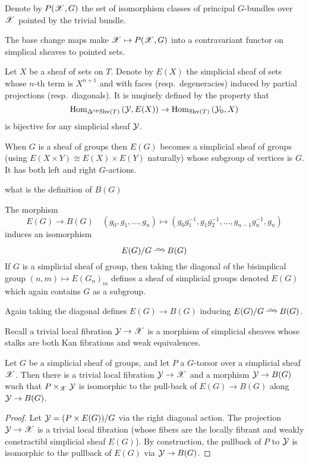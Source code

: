 \documentclass[12pt]{article}
\begin{document}
Denote by $P(\mathscr{X}, G)$ the set of isomorphism classes of principal $G$-bundles over $\mathscr{X}$ pointed by the trivial bundle.

\begin{rmk}
The base change maps make $\mathscr{X} \mapsto P(\mathscr{X}, G)$ into a contravariant functor on simplical sheaves to pointed sets. 
\end{rmk}

\begin{defn}
Let $X$ be a sheaf of sets on $T$. Denote by $E(X)$ the simplicial sheaf of sets whose $n$-th term is $X^{n+1}$ and with faces (resp.\ degeneracies) induced by partial projections (resp.\ diagonals). It is unqiuely defined by the property that
\[ \mathrm{Hom}_{\Delta^{\mathrm{op}} \mathrm{Shv}(T)} \left( \mathcal{Y}, E(X) \right) \to \mathrm{Hom}_{\mathrm{Shv}(T)} \left( \mathcal{Y}_0, X \right) \]
is bijective for any simplicial sheaf $\mathcal{Y}$.
\end{defn}

When $G$ is a sheaf of groups then $E(G)$ becomes a simplicial sheaf of groups (using $E(X \times Y) \cong E(X) \times E(Y)$ naturally) whose subgroup of vertices is $G$. It has both left and right $G$-actions. 


{\color{red} what is the definition of $B(G)$}

The morphism
\[ E(G) \to B(G) \quad (g_0, g_1, \dots, g_n) \mapsto (g_0  g_1^{-1}, g_1 g_2^{-1}, \dots, g_{n-1} g_n^{-1}, g_n) \]
induces an isomorphism
\[ E(G) / G \iso B(G) \]
If $G$ is a simplicial sheaf of group, then taking the diagonal of the bisimplical group $(n,m) \mapsto E(G_n)_m$ defines a sheaf of simplicial groups denoted $E(G)$ which again contains $G$ as a subgroup. 
\par 
Again taking the diagonal defines $E(G) \to B(G)$ inducing $E(G)/G \iso B(G)$.

\begin{rmk}
Recall a trivial local fibration $\mathcal{Y} \to \mathscr{X}$ is a morphism of simplicial sheaves whose stalks are both Kan fibrations and weak equivalences. 
\end{rmk}

\begin{lemma}
Let $G$ be a simplicial sheaf of groups, and let $P$ a $G$-torsor over a simplicial sheaf $\mathscr{X}$. Then there is a trivial local fibration $\mathcal{Y} \to \mathscr{X}$ and a morphism $\mathcal{Y} \to B(G)$ wuch that $P \times_{\mathscr{X}} \mathcal{Y}$ is isomorphic to the pull-back of $E(G) \to B(G)$ along $\mathcal{Y} \to B(G)$.
\end{lemma}

\begin{proof}
Let $\mathcal{Y} = (P \times E(G))/G$ via the right diagonal action. The projection $\mathcal{Y} \to \mathscr{X}$ is a trivial local fibration (whose fibers are the locally fibrant and weakly constractibl simplicial sheaf $E(G)$). By construction, the pullback of $P$ to $\mathcal{Y}$ is isomorphic to the pullback of $E(G)$ via $\mathcal{Y} \to B(G)$.
\end{proof}
\end{document}
